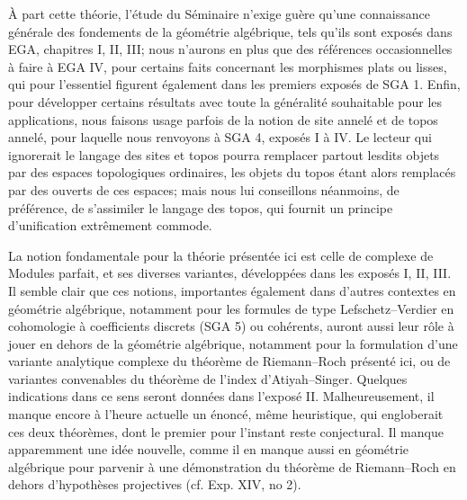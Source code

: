\documentclass[11pt]{article}
\begin{document}
À part cette théorie, l'étude du Séminaire n'exige guère qu'une connaissance générale des fondements de la géométrie algébrique, tels qu'ils sont exposés dans EGA, chapitres I, II, III; nous n'aurons en plus que des références occasionnelles à faire à EGA IV, pour certains faits concernant les morphismes plats ou lisses, qui pour l'essentiel figurent également dans les premiers exposés de SGA 1. Enfin, pour développer certains résultats avec toute la généralité souhaitable pour les applications, nous faisons usage parfois de la notion de site annelé et de topos annelé, pour laquelle nous renvoyons à SGA 4, exposés I à IV. Le lecteur qui ignorerait le langage des sites et topos pourra remplacer partout lesdits objets par des espaces topologiques ordinaires, les objets du topos étant alors remplacés par des ouverts de ces espaces; mais nous lui conseillons néanmoins, de préférence, de s'assimiler le langage des topos, qui fournit un principe d'unification extrêmement commode.

La notion fondamentale pour la théorie présentée ici est celle de complexe de Modules parfait, et ses diverses variantes, développées dans les exposés I, II, III. Il semble clair que ces notions, importantes également dans d'autres contextes en géométrie algébrique, notamment pour les formules de type Lefschetz--Verdier en cohomologie à coefficients discrets (SGA 5) ou cohérents, auront aussi leur rôle à jouer en dehors de la géométrie algébrique, notamment pour la formulation d'une variante analytique complexe du théorème de Riemann--Roch présenté ici, ou de variantes convenables du théorème de l'index d'Atiyah--Singer. Quelques indications dans ce sens seront données dans l'exposé II. Malheureusement, il manque encore à l'heure actuelle un énoncé, même heuristique, qui engloberait ces deux théorèmes, dont le premier pour l'instant reste conjectural. Il manque apparemment une idée nouvelle, comme il en manque aussi en géométrie algébrique pour parvenir à une démonstration du théorème de Riemann--Roch en dehors d'hypothèses projectives (cf. Exp. XIV, no 2).
\end{document}
